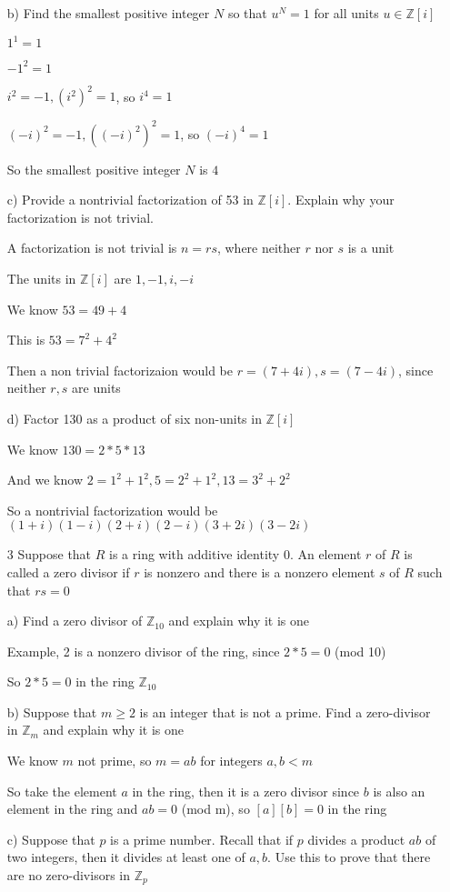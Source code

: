 \documentclass[11pt]{article}
\begin{document}
\begin{itemize}
  b) Find the smallest positive integer $N$ so that $u^N = 1$ for all units $u \in\mathbb{Z}[i]$

  $1^1 = 1$

  $-1^2 = 1$

  $i^2 = -1, (i^2)^2 = 1$, so $i^4 = 1$

  $(-i)^2 = -1, ((-i)^2)^2 = 1$, so $(-i)^4 = 1$

  So the smallest positive integer $N$ is $4$

  c) Provide a nontrivial factorization of 53 in $\mathbb{Z}[i]$. Explain why your factorization is not trivial.

  A factorization is not trivial is $n = rs$, where neither $r$ nor $s$ is a unit

  The units in $\mathbb{Z}[i]$ are $1,-1,i,-i$

  We know $53 = 49 + 4$

  This is $53 = 7^2 + 4^2$

  Then a non trivial factorizaion would be $r = (7 + 4i), s = (7 - 4i)$, since neither $r,s$ are units

  d) Factor 130 as a product of six non-units in $\mathbb{Z}[i]$

  We know $130 = 2*5*13$

  And we know $2 = 1^2 + 1^2, 5 = 2^2 + 1^2, 13 = 3^2 + 2^2$

  So a nontrivial factorization would be $(1+i)(1-i)(2+i)(2-i)(3+2i)(3-2i)$

\item[3]
  Suppose that $R$ is a ring with additive identity 0. An element $r$ of $R$ is called a zero divisor if $r$ is nonzero and there is a nonzero element $s$ of $R$ such that $rs = 0$

  a) Find a zero divisor of $\mathbb{Z}_{10}$ and explain why it is one

  Example, 2 is a nonzero divisor of the ring, since $2*5 = 0$ (mod 10)

  So $2*5 = 0$ in the ring $\mathbb{Z}_{10}$

  b) Suppose that $m \geq 2$ is an integer that is not a prime. Find a zero-divisor in $\mathbb{Z}_m$ and explain why it is one

  We know $m$ not prime, so $m = ab$ for integers $a,b < m$

  So take the element $a$ in the ring, then it is a zero divisor since $b$ is also an element in the ring and $ab = 0$ (mod m), so $[a][b] = 0$ in the ring

  c) Suppose that $p$ is a prime number. Recall that if $p$ divides a product $ab$ of two integers, then it divides at least one of $a, b$. Use this to prove that there are no zero-divisors in $\mathbb{Z}_p$


\end{itemize}
\end{document}
